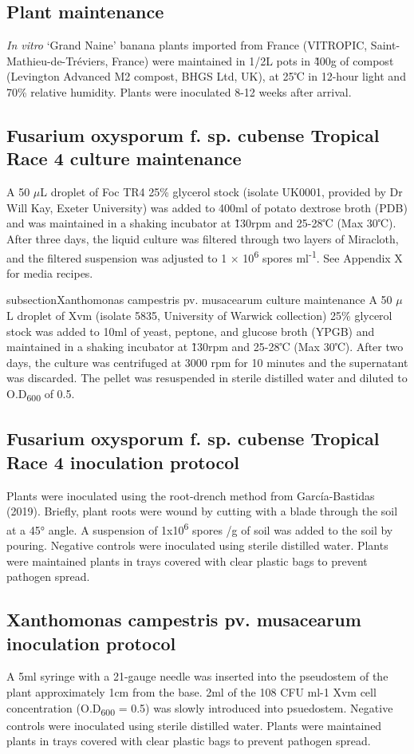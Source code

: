 \subsection{Plant maintenance }
\textit{In vitro }‘Grand Naine’ banana plants imported from France (VITROPIC, Saint-Mathieu-de-Tréviers, France) were maintained in 1/2L pots in \~400g of compost (Levington Advanced M2 compost, BHGS Ltd, UK), at 25℃ in 12-hour light and 70\% relative humidity. Plants were inoculated 8-12 weeks after arrival. 

\subsection{Fusarium oxysporum f. sp. cubense Tropical Race 4 culture maintenance}
A 50 \(\mu\)L droplet of Foc TR4 25\% glycerol stock (isolate UK0001, provided by Dr Will Kay, Exeter University) was added to 400ml of potato dextrose broth (PDB) and was maintained in a shaking incubator at \~130rpm and 25-28℃ (Max 30℃). After three days, the liquid culture was filtered through two layers of Miracloth, and the filtered suspension was adjusted to 1 × 10\textsuperscript{6} spores ml\textsuperscript{-1}. See Appendix X for media recipes.

subsection{Xanthomonas campestris pv. musacearum culture maintenance}
A 50 \(\mu\)L droplet of Xvm (isolate 5835, University of Warwick collection) 25\% glycerol stock was added to 10ml of yeast, peptone, and glucose broth (YPGB) and maintained in a shaking incubator at \~130rpm and 25-28℃ (Max 30℃). After two days, the culture was centrifuged at 3000 rpm for 10 minutes and the supernatant was discarded. The pellet was resuspended in sterile distilled water and diluted to O.D\textsubscript{600} of 0.5. 

\subsection{Fusarium oxysporum f. sp. cubense Tropical Race 4 inoculation protocol}
Plants were inoculated using the root-drench method from García-Bastidas \et (2019). Briefly, plant roots were wound by cutting with a blade through the soil at a 45° angle. A suspension of 1x10\textsuperscript{6} spores /g of soil was added to the soil by pouring. Negative controls were inoculated using sterile distilled water. Plants were maintained plants in trays covered with clear plastic bags to prevent pathogen spread. 

\subsection{Xanthomonas campestris pv. musacearum inoculation protocol}
A 5ml syringe with a 21-gauge needle was inserted into the pseudostem of the plant approximately 1cm from the base. 2ml of the 108 CFU ml-1 Xvm cell concentration (O.D\textsubscript{600} = 0.5) was slowly introduced into psuedostem. Negative controls were inoculated using sterile distilled water. Plants were maintained plants in trays covered with clear plastic bags to prevent pathogen spread. 


